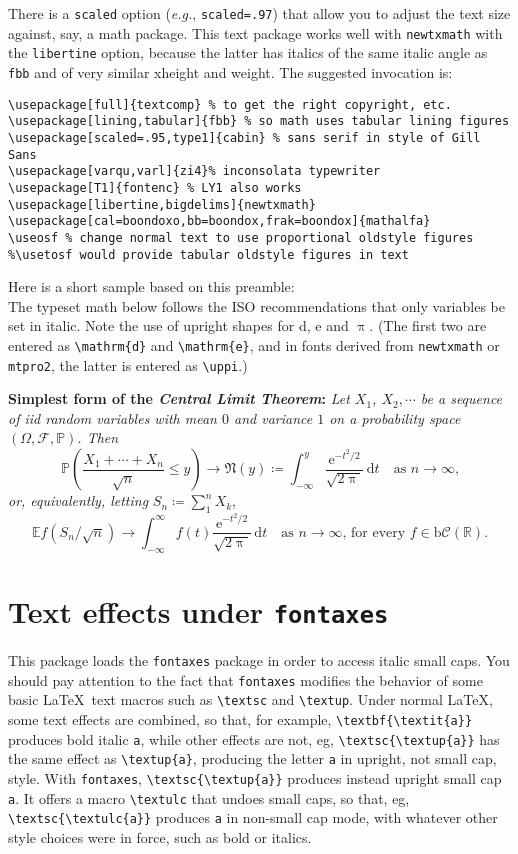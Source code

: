 \documentclass{article}
\begin{document}
There is a {\tt scaled} option (\emph{e.g.}, {\tt scaled=.97}) that allow you to adjust the text size against, say, a math package. This text package works well with {\tt newtxmath} with the {\tt libertine} option, because the latter has italics of the same italic angle as {\tt fbb} and of very similar xheight and weight. The suggested invocation is:
\begin{verbatim}
\usepackage[full]{textcomp} % to get the right copyright, etc.
\usepackage[lining,tabular]{fbb} % so math uses tabular lining figures
\usepackage[scaled=.95,type1]{cabin} % sans serif in style of Gill Sans
\usepackage[varqu,varl]{zi4}% inconsolata typewriter
\usepackage[T1]{fontenc} % LY1 also works
\usepackage[libertine,bigdelims]{newtxmath}
\usepackage[cal=boondoxo,bb=boondox,frak=boondox]{mathalfa}
\useosf % change normal text to use proportional oldstyle figures
%\usetosf would provide tabular oldstyle figures in text
\end{verbatim}
Here is a short sample based on this preamble:\\[4pt]
\def\Pr{\ensuremath{\mathbb{P}}}
\def\rmd{\mathrm{d}}
The typeset math below follows the ISO recommendations that only variables
be set in italic. Note the use of upright shapes for $\rmd$, $\mathrm{e}$
and $\uppi$. (The first two are entered as \verb|\mathrm{d}| and
\verb|\mathrm{e}|, and in fonts derived from {\tt newtxmath} or {\tt mtpro2},
 the latter is entered as \verb|\uppi|.)

\textbf{Simplest form of the \textit{Central Limit Theorem}:} \textit{Let
$X_1$, $X_2,\cdots$ be a sequence of iid random variables with mean $0$ 
and variance $1$ on a probability space $(\Omega,\mathcal{F},\Pr)$. Then}
\[\Pr\left(\frac{X_1+\cdots+X_n}{\sqrt{n}}\le y\right)\to\mathfrak{N}(y)\coloneq
\int_{-\infty}^y \frac{\mathrm{e}^{-t^2/2}}{\sqrt{2\uppi}}\,
\mathrm{d}t\quad\mbox{as $n\to\infty$,}\]
\textit{or, equivalently, letting} $S_n\coloneq\sum_1^n X_k$,
\[\mathbb{E} f(S_n/\sqrt{n})\to \int_{-\infty}^\infty f(t)
\frac{\mathrm{e}^{-t^2/2}}{\sqrt{2\uppi}}\,\mathrm{d}t
\quad\mbox{as $n\to\infty$, for every $f\in\mathrm{b}
\mathcal{C}(\mathbb{R})$.}\]

\section{Text effects under \texttt{fontaxes}}
This package loads the {\tt fontaxes} package in order to access italic small caps. You should pay attention to the fact that {\tt fontaxes} modifies the behavior of some basic \LaTeX\ text macros such as \verb|\textsc| and \verb|\textup|. Under normal \LaTeX, some text effects are combined, so that, for example, \verb|\textbf{\textit{a}}| produces bold italic {\tt a}, while other effects are not, eg, \verb|\textsc{\textup{a}}| has the same effect as \verb|\textup{a}|, producing the letter {\tt a} in upright, not small cap, style. With {\tt fontaxes}, \verb|\textsc{\textup{a}}| produces instead upright small cap {\tt a}. It offers a macro \verb|\textulc| that undoes small caps, so that, eg, \verb|\textsc{\textulc{a}}| produces {\tt a} in non-small cap mode, with whatever other style choices were in force, such as bold or italics.
\end{document}
